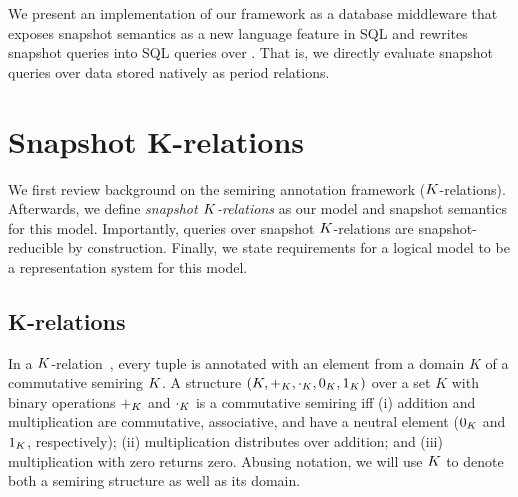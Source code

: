 We present an implementation of our framework as a database middleware
that exposes snapshot semantics as a new language feature in
SQL and rewrites snapshot queries into SQL queries over
\SQLrels{}.  That is, we directly evaluate
snapshot queries over data stored natively as period relations.
%


\newpage
\section{Snapshot K-relations} %
\label{sec:snapshot-k-relations}

We first review background on the semiring annotation framework ($K$-relations). Afterwards,  we define  \textit{snapshot $K$-relations} as our 
model and snapshot semantics for this model. Importantly, queries over snapshot $K$-relations are snapshot-reducible by construction. Finally, we state requirements for a logical model to be a representation system
for this  model.

\subsection{K-relations}
\label{sec:k-relations}

In a $K$-relation~\cite{GK07}, every tuple is annotated with an
element from a domain $K$ of a commutative semiring $K$. %
%
A structure $(K, +_{K}, \cdot_{K}, 0_{K}, 1_{K})$ over a set $K$
with binary operations $+_{K}$ and $\cdot_{K}$
is a commutative semiring iff (i) addition and
multiplication are commutative, associative, and have a neutral element ($0_{K}$ and $1_{K}$, respectively);
(ii) multiplication distributes over addition; and (iii) multiplication with zero
returns zero. Abusing notation, we
will   use $K$ to denote both a semiring structure as well as its
  domain.

